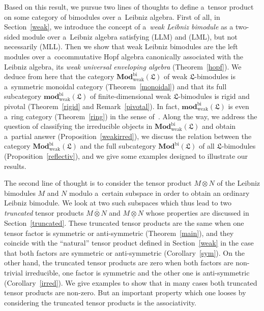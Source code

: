 \documentclass{jonasart}
\DeclareMathOperator{\bi}{bi}
\DeclareMathOperator{\weak}{weak}
\newcommand{\fdmod}{\mathbf{mod}}
\newcommand{\lf}{\mathfrak{L}}
\newcommand{\Mod}{\mathbf{Mod}}
\newcommand{\ovo}{\overline{\otimes}}
\newcommand{\und}{\underline{\otimes}}
\begin{document}
	Based on this result, we pursue two lines of thoughts to define a~tensor product on some category of bimodules over a~Leibniz algebra. First of all, in Section~\ref{weak}, we introduce the concept of a~\textit{weak Leibniz bimodule\/} as a two-sided module over a~Leibniz algebra satisfying (LLM) and (LML), but not necessarily (MLL). Then we show that weak Leibniz bimodules are the left modules over a~cocommutative Hopf algebra canonically associated with the Leibniz algebra, its \textit{weak universal enveloping algebra\/} (Theorem~\ref{hopf}). We deduce from here that the category $\Mod^{\bi}_{\weak}(\lf)$ of weak $\lf$-bimodules is a~symmetric monoidal category (Theorem~\ref{monoidal}) and that its full subcategory $\fdmod^{\bi}_{\weak}(\lf)$ of finite-dimensional weak $\lf$-bimodules is rigid and pivotal (Theorem~\ref{rigid} and Remark~\ref{pivotal}). In fact, $\fdmod^{\bi}_{\weak}(\lf)$ is even a~ring category (Theorem~\ref{ring}) in the sense of~\cite{EGNO}. Along the way, we address the question of classifying the irreducible objects in $\Mod^{\bi}_{\weak}(\lf)$ and obtain a~partial answer (Proposition~\ref{weakirred}), we discuss the relation between the category $\Mod^{\bi}_{\weak}(\lf)$ and the full subcategory $\Mod^{\bi}(\lf)$ of all $\lf$-bimodules (Proposition~\ref{reflectiv}), and we give some examples designed to illustrate our results.
\medskip 

	The second line of thought is to consider the tensor product $M\otimes N$ of the Leibniz bimodules $M$ and $N$ modulo a~certain subspace in order to obtain an ordinary Leibniz bimodule. We look at two such subspaces which thus lead to two \textit{truncated\/} tensor products $M\ovo N$ and $M\und N$ whose properties are discussed in Section~\ref{truncated}. These truncated tensor products are the same when one tensor factor is symmetric or anti-symmetric (Theorem~\ref{main}), and they coincide with the ``natural'' tensor product defined in Section~\ref{weak} in the case that both factors are symmetric or anti-symmetric (Corollary~\ref{sym}). On the other hand, the truncated tensor products are zero when both factors are non-trivial irreducible, one factor is symmetric and the other one is anti-symmetric (Corollary~\ref{irred}). We give examples to show that in many cases both truncated tensor products are non-zero. But an important property which one looses by considering the truncated tensor products is the associativity.
\medskip 
\end{document}
